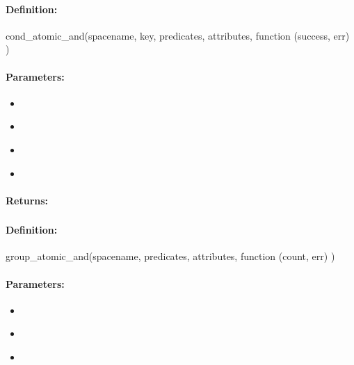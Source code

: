 \paragraph{Definition:}
\begin{javascriptcode}
cond_atomic_and(spacename, key, predicates, attributes, function (success, err) {})
\end{javascriptcode}
\paragraph{Parameters:}
\begin{itemize}[noitemsep]
\item {}\\

\item {}\\

\item {}\\

\item {}\\

\end{itemize}

\paragraph{Returns:}


\pagebreak
\subsubsection{}
\label{api:nodejs:group_atomic_and}


\paragraph{Definition:}
\begin{javascriptcode}
group_atomic_and(spacename, predicates, attributes, function (count, err) {})
\end{javascriptcode}
\paragraph{Parameters:}
\begin{itemize}[noitemsep]
\item {}\\

\item {}\\

\item {}\\

\end{itemize}

